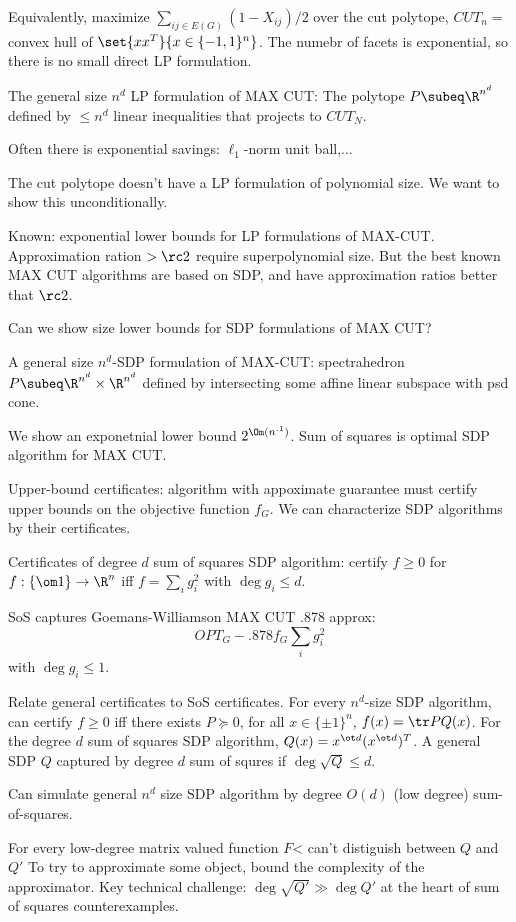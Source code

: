 Equivalently, maximize $\sum_{ij\in E(G)}(1-X_{ij})/2$ over the cut polytope, $CUT_n=$convex hull of $\set{xx^T}{x\in \{-1,1\}^n}$.
The numebr of facets is exponential, so there is no small direct LP formulation.

The general size $n^d$ LP formulation of MAX CUT: The polytope $P\subeq \R^{n^d}$ defined by $\le n^d$ linear inequalities that projects to $CUT_N$. 

Often there is exponential savings: $\ell_1$-norm unit ball,...

The cut polytope doesn't have a LP formulation of polynomial size. We want to show this unconditionally.

Known: exponential lower bounds for LP formulations of MAX-CUT. Approximation ration $>\rc2$ require superpolynomial size. But the best known MAX CUT algorithms are based on SDP, and have approximation ratios better that $\rc2$.

Can we show size lower bounds for SDP formulations of MAX CUT?

A general size $n^d$-SDP formulation of MAX-CUT: spectrahedron $P\subeq \R^{n^d}\times \R^{n^d}$ defined by intersecting some affine linear subspace with psd cone. 

We show an exponetnial lower bound $2^{\Om(n^{.1})}$. Sum of squares is optimal SDP algorithm for MAX CUT.

Upper-bound certificates: algorithm with appoximate guarantee must certify upper bounds on the objective function $f_G$.  We can characterize SDP algorithms by their certificates. 

Certificates of degree $d$ sum of squares SDP algorithm: certify $f\ge 0$ for $f:\{\om 1\}\to \R^n$ iff $f=\sum_i g_i^2$ with $\deg g_i\le d$. 

SoS captures Goemans-Williamson MAX CUT .878 approx:
\[
OPT_G-.878f_G\sum_i g_i^2
\]
with $\deg g_i\le 1$.

Relate general certificates to SoS certificates. For every $n^d$-size SDP algorithm, can certify $f\ge 0$ iff there exists $P\succeq 0$, for all $x\in \{\pm1\}^n$, $f(x)=\tr PQ(x)$. For the degree $d$ sum of squares SDP algorithm, $Q(x)=x^{\ot d}(x^{\ot d})^T$. A general SDP $Q$ captured by degree $d$ sum of squres if $\deg\sqrt{Q}\le d$.

Can simulate general $n^d$ size SDP algorithm by degree $O(d)$ (low degree) sum-of-squares.

For every low-degree matrix valued function $F$< can't distiguish between $Q$ and $Q'$ To try to approximate some object, bound the  complexity of the approximator. %
Key technical challenge: $\deg\sqrt{Q'}\gg \deg Q'$ at the heart of sum of squares counterexamples.

